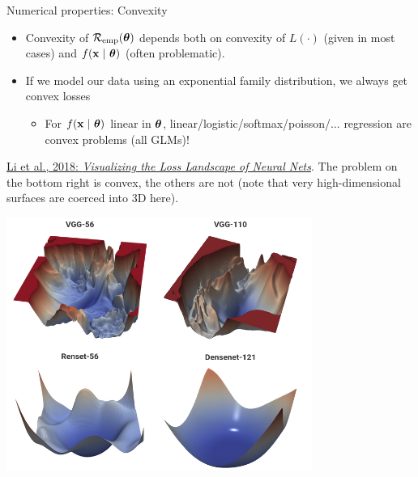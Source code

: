 \documentclass[11pt,compress,t,notes=noshow, xcolor=table]{beamer}
\begin{document}
\begin{vbframe}{Numerical properties: Convexity}

\begin{itemize}
  \setlength\itemsep{1em}
  \item Convexity of $\mathcal{R}_{\text{emp}}(\bm{\theta})$ depends both on convexity of $L(\cdot)$ (given in most cases) and $f(\mathbf{x} ~|~ \bm{\theta})$ (often problematic).
  \item If we model our data using an exponential family distribution, we always get convex losses
  \begin{itemize} 
    \item For $f(\mathbf{x} ~|~ \bm{\theta})$ linear in $\bm{\theta}$, linear/logistic/softmax/poisson/$\ldots$ regression are convex problems (all GLMs)! 
  \end{itemize}  
\end{itemize} 

\vfill

\begin{minipage}[b]{0.5\textwidth}
  \footnotesize \raggedright
  \href{https://arxiv.org/pdf/1712.09913.pdf}{Li et al., 2018: 
  \textit{Visualizing the Loss Landscape of Neural Nets}}. 
  The problem on the bottom right is convex, the others are not (note that 
  very high-dimensional surfaces are coerced into 3D here).  
  \\
  \phantom{foo}
\end{minipage}%
\begin{minipage}[b]{0.05\textwidth}
  \phantom{foo}
\end{minipage}%
\begin{minipage}[b]{0.45\textwidth}
  \includegraphics[width=0.75\textwidth]{
  figure_man/convex-vs-nonconfex-landscape}
\end{minipage}%

\end{vbframe}
\end{document}

